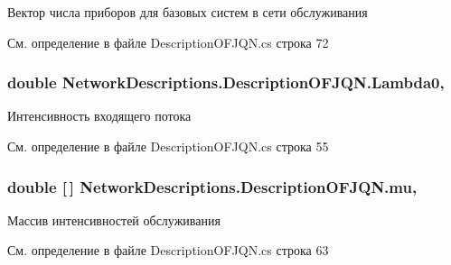 Вектор числа приборов для базовых систем в сети обслуживания 



См. определение в файле Description\+O\+F\+J\+Q\+N.\+cs строка 72

\subsubsection[{\texorpdfstring{Lambda0}{Lambda0}}]{\setlength{\rightskip}{0pt plus 5cm}double Network\+Descriptions.\+Description\+O\+F\+J\+Q\+N.\+Lambda0\hspace{0.3cm}{\ttfamily [get]}, {\ttfamily [set]}}\hypertarget{class_network_descriptions_1_1_description_o_f_j_q_n_a0670c1d5fa5d487f7bddb667d421a85c}{}\label{class_network_descriptions_1_1_description_o_f_j_q_n_a0670c1d5fa5d487f7bddb667d421a85c}


Интенсивность входящего потока 



См. определение в файле Description\+O\+F\+J\+Q\+N.\+cs строка 55

\subsubsection[{\texorpdfstring{mu}{mu}}]{\setlength{\rightskip}{0pt plus 5cm}double \mbox{[}$\,$\mbox{]} Network\+Descriptions.\+Description\+O\+F\+J\+Q\+N.\+mu\hspace{0.3cm}{\ttfamily [get]}, {\ttfamily [set]}}\hypertarget{class_network_descriptions_1_1_description_o_f_j_q_n_a378792ff9db7825dfeee852298fd3314}{}\label{class_network_descriptions_1_1_description_o_f_j_q_n_a378792ff9db7825dfeee852298fd3314}


Массив интенсивностей обслуживания 



См. определение в файле Description\+O\+F\+J\+Q\+N.\+cs строка 63

